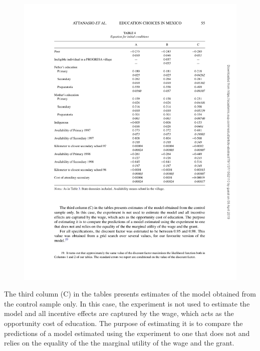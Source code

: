 \documentclass{handoutForSolutions}
\begin{document}
\begin{figure}[H]
\centering
\includegraphics[width=1\linewidth]{image/AttanasioMeghir Santiago2011Figure4.pdf}
\end{figure}
The third column (C) in the tables presents estimates of the model obtained from the control sample only. In this case, the experiment is not used to estimate the model and all incentive effects are captured by the wage, which acts as the opportunity cost of education. The purpose of estimating it is to compare the predictions of a model estimated using the experiment to one that does not and relies on the equality of the the marginal utility of the wage and the grant.
\end{document}
